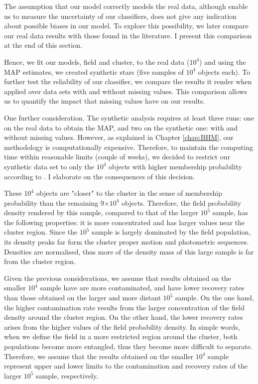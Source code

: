 The assumption that our model correctly models the real data, although enable us to measure the uncertainty of our classifiers, does not give any indication about possible biases in our model. To explore this possibility, we later compare our real data results with those found in the literature. I present this comparison at the end of this section.

Hence, we fit our models, field and cluster, to the real data ($10^4$) and using the MAP estimates, we created synthetic stars (five samples of $10^4$ objects each). To further test the reliability of our classifier, we compare the results it render when applied over data sets with and without missing values. This comparison allows us to quantify the impact that missing values have on our results.    

One further consideration. The synthetic analysis requires at least three runs: one on the real data to obtain the MAP, and two on the synthetic one: with and without missing values. However, as explained in Chapter \ref{chap:BHM}, our methodology is computationally expensive. Therefore, to maintain the computing time within reasonable limits (couple of weeks), we decided to restrict our synthetic data set to only the $10^4$ objects with higher membership probability according to \citet{Bouy2015}. I elaborate on the consequences of this decision.

These $10^4$ objects are "closer" to the cluster in the sense of membership probability than the remaining 9$\times 10^4$ objects. Therefore, the field probability density rendered by this sample, compared to that of the larger $10^5$ sample, has the following properties: it is more concentrated and has larger values near the cluster region. Since the $10^5$ sample is largely dominated by the field population, its density peaks far form the cluster proper motion and photometric sequences. Densities are normalised, thus more of the density mass of this large sample is far from the cluster region. 

Given the previous considerations, we assume that results obtained on the smaller $10^4$ sample have are more contaminated, and have lower recovery rates than those obtained on the larger and more distant $10^5$ sample. On the one hand, the higher contamination rate results from the larger concentration of the field density around the cluster region.  On the other hand, the lower recovery rates arises from the higher values of the field probability density. In simple words, when we define the field in a more restricted region around the cluster, both populations become more entangled, thus they become more difficult to separate. Therefore, we assume that the results obtained on the smaller $10^4$ sample represent upper and lower limits to the contamination and recovery rates of the larger $10^5$ sample, respectively.


